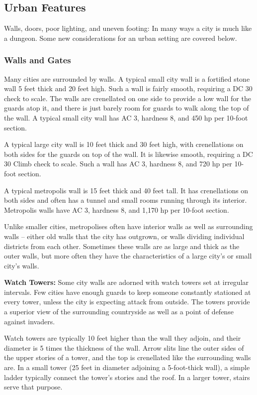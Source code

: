 \subsection{Urban Features}

Walls, doors, poor lighting, and uneven footing: In many ways a city is much like 
a dungeon. Some new considerations for an urban setting are covered below.

\subsubsection{Walls and Gates}

Many cities are surrounded by walls. A typical small city wall is a fortified stone 
wall 5 feet thick and 20 feet high. Such a wall is fairly smooth, requiring a DC 
30  check to scale. The walls are crenellated on one side to provide a low 
wall for the guards atop it, and there is just barely room for guards to walk along 
the top of the wall. A typical small city wall has AC 3, hardness 8, and 450 hp 
per 10-foot section.

A typical large city wall is 10 feet thick and 30 feet high, with crenellations 
on both sides for the guards on top of the wall. It is likewise smooth, requiring 
a DC 30 Climb check to scale. Such a wall has AC 3, hardness 8, and 720 hp per 
10-foot section.

A typical metropolis wall is 15 feet thick and 40 feet tall. It has crenellations 
on both sides and often has a tunnel and small rooms running through its interior. 
Metropolis walls have AC 3, hardness 8, and 1,170 hp per 10-foot section.

Unlike smaller cities, metropolises often have interior walls as well as surrounding 
walls -- either old walls that the city has outgrown, or walls dividing individual 
districts from each other. Sometimes these walls are as large and thick as the 
outer walls, but more often they have the characteristics of a large city's or 
small city's walls.

\textbf{Watch Towers:} Some city walls are adorned with watch towers set at irregular 
intervals. Few cities have enough guards to keep someone constantly stationed at 
every tower, unless the city is expecting attack from outside. The towers provide 
a superior view of the surrounding countryside as well as a point of defense against 
invaders.

Watch towers are typically 10 feet higher than the wall they adjoin, and their 
diameter is 5 times the thickness of the wall. Arrow slits line the outer sides 
of the upper stories of a tower, and the top is crenellated like the surrounding 
walls are. In a small tower (25 feet in diameter adjoining a 5-foot-thick wall), 
a simple ladder typically connect the tower's stories and the roof. In a larger 
tower, stairs serve that purpose. 

